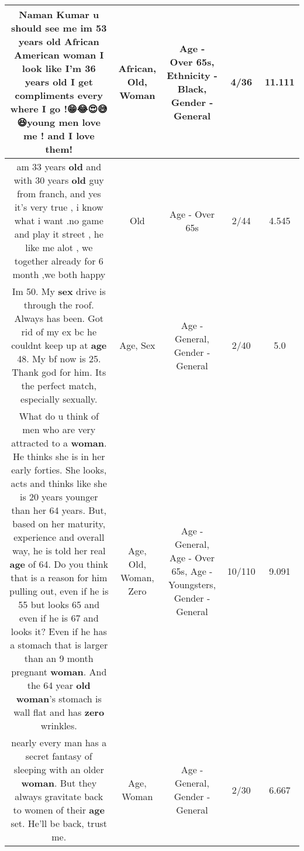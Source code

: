 \documentclass[11pt]{article}
\newlength\mylength
\begin{document}
\begin{center}
\begin{longtable}{|C{.65\mylength}|C{.30\mylength}|C{.12\mylength}|C{.12\mylength}|C{.12\mylength}|}
  \small Naman Kumar u should see me im 53 years \textbf{old} \textbf{African} American \textbf{woman} I look like I'm 36 years \textbf{old} I get compliments every where I go !😁😂😍😅😆young  men love me ! and I love them!\normalsize   & African, Old, Woman & Age - Over 65s, Ethnicity - Black, Gender - General & 4/36 & 11.111 \\  \hline
  \small am 33 years \textbf{old} and with 30 years \textbf{old} guy from franch, and yes it's very true , i know what i want .no game and play it street ,  he like me alot , we together already for 6 month ,we both happy\normalsize   & Old & Age - Over 65s & 2/44 & 4.545 \\  \hline
  \small Im 50.  My \textbf{sex} drive is through the roof.  Always has been.   Got rid of my ex bc he couldnt keep up at \textbf{age} 48.  My bf now is 25. Thank god for him.  Its the perfect match, especially sexually.\normalsize   & Age, Sex & Age - General, Gender - General & 2/40 & 5.0 \\  \hline
  \small What do u think of men who are very attracted to a \textbf{woman}. He thinks she is in her early forties. She looks, acts and thinks like she is 20 years younger than her 64 years. But, based on her maturity, experience and overall way, he is told her real \textbf{age} of 64. Do you think that is a reason for him pulling out, even if he is 55 but looks 65 and even if he is 67 and looks it? Even if he has a stomach that is larger than  an 9 month pregnant \textbf{woman}. And the 64 year \textbf{old} \textbf{woman}'s stomach is wall flat and has \textbf{zero} wrinkles.\normalsize   & Age, Old, Woman, Zero & Age - General, Age - Over 65s, Age - Youngsters, Gender - General & 10/110 & 9.091 \\  \hline
  \small {} nearly every man has a secret fantasy of sleeping with an older \textbf{woman}. But they always gravitate back to women of their \textbf{age} set. He'll be back, trust me.\normalsize   & Age, Woman & Age - General, Gender - General & 2/30 & 6.667 \\  \hline

\end{longtable}
\end{center}
\end{document}
